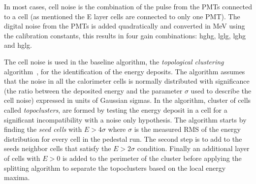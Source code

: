 In most cases, cell noise is the combination of the pulse from the PMTs
connected to a cell (as mentioned the E layer cells are connected to only one
PMT). The digital noise from the PMTs is added quadratically and converted in
MeV using the calibration constants, this results in four gain combinations:
\gls{hghg}, \gls{lglg}, \gls{lghg} and \gls{hglg}.

The cell noise is used in the baseline algorithm, the \emph{topological
  clustering} algorithm~\cite{JetCluster}, for the identification of the energy
deposits. The algorithm assumes that the noise in all the calorimeter cells is
normally distributed with significance (the ratio between the deposited energy
and the parameter $\sigma$ used to describe the cell noise) expressed in units
of Gaussian sigmas. In the algorithm, cluster of cells called
\emph{topoclusters}, are formed by testing the energy deposit in a cell for a
significant incompatibility with a noise only hypothesis. The algorithm starts
by finding the \emph{seed cells} with $E > 4 \sigma$ where $\sigma$ is the
measured RMS of the energy distribution for every cell in the pedestal run. The
second step is to add to the seeds neighbor cells that satisfy the
$E > 2 \sigma$ condition. Finally an additional layer of cells with $E > 0$ is
added to the perimeter of the cluster before applying the splitting algorithm to
separate the topoclusters based on the local energy maxima.

